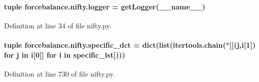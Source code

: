 \hypertarget{namespaceforcebalance_1_1nifty_a1859e992ed983dbbcc8093fdd19710e7}{
\paragraph[{logger}]{\setlength{\rightskip}{0pt plus 5cm}tuple forcebalance.\-nifty.\-logger = get\-Logger(\-\_\-\-\_\-name\-\_\-\-\_\-)}}\label{namespaceforcebalance_1_1nifty_a1859e992ed983dbbcc8093fdd19710e7}


Definition at line 34 of file nifty.\-py.

\hypertarget{namespaceforcebalance_1_1nifty_ab652c941890b0f378100433699c8d255}{
\paragraph[{specific\-\_\-dct}]{\setlength{\rightskip}{0pt plus 5cm}tuple forcebalance.\-nifty.\-specific\-\_\-dct = dict(list(itertools.\-chain($\ast$\mbox{[}\mbox{[}(j,i\mbox{[}1\mbox{]}) for j in i\mbox{[}0\mbox{]}\mbox{]} for i in {\bf specific\-\_\-lst}\mbox{]})))}}\label{namespaceforcebalance_1_1nifty_ab652c941890b0f378100433699c8d255}


Definition at line 730 of file nifty.\-py.

